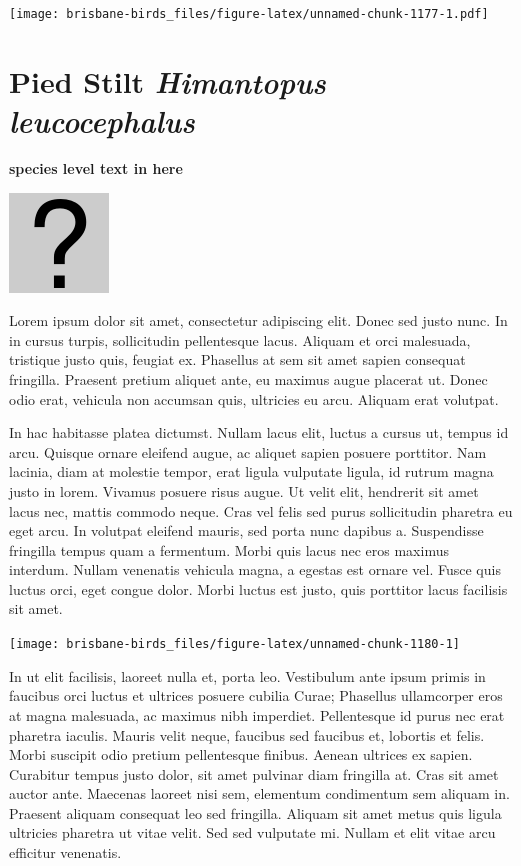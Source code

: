 \documentclass[]{book}
\let\origfigure\figure
\let\endorigfigure\endfigure
\renewenvironment{figure}[1][2] {
  \expandafter\origfigure\expandafter[H]
} {
  \endorigfigure
}
\begin{document}
\texttt{[image: brisbane-birds\_files/figure-latex/unnamed-chunk-1177-1.pdf]}

\section{\texorpdfstring{Pied Stilt \emph{Himantopus
leucocephalus}}{Pied Stilt Himantopus leucocephalus}}\label{pied-stilt-himantopus-leucocephalus}

\textbf{species level text in here}

\begin{figure}
\centering
\includegraphics{assets/missing.png}
\caption{No image for species}
\end{figure}

Lorem ipsum dolor sit amet, consectetur adipiscing elit. Donec sed justo
nunc. In in cursus turpis, sollicitudin pellentesque lacus. Aliquam et
orci malesuada, tristique justo quis, feugiat ex. Phasellus at sem sit
amet sapien consequat fringilla. Praesent pretium aliquet ante, eu
maximus augue placerat ut. Donec odio erat, vehicula non accumsan quis,
ultricies eu arcu. Aliquam erat volutpat.

In hac habitasse platea dictumst. Nullam lacus elit, luctus a cursus ut,
tempus id arcu. Quisque ornare eleifend augue, ac aliquet sapien posuere
porttitor. Nam lacinia, diam at molestie tempor, erat ligula vulputate
ligula, id rutrum magna justo in lorem. Vivamus posuere risus augue. Ut
velit elit, hendrerit sit amet lacus nec, mattis commodo neque. Cras vel
felis sed purus sollicitudin pharetra eu eget arcu. In volutpat eleifend
mauris, sed porta nunc dapibus a. Suspendisse fringilla tempus quam a
fermentum. Morbi quis lacus nec eros maximus interdum. Nullam venenatis
vehicula magna, a egestas est ornare vel. Fusce quis luctus orci, eget
congue dolor. Morbi luctus est justo, quis porttitor lacus facilisis sit
amet.

\begin{figure}
\texttt{[image: brisbane-birds\_files/figure-latex/unnamed-chunk-1180-1]} \caption{insert figure caption}\label{fig:unnamed-chunk-1180}
\end{figure}

In ut elit facilisis, laoreet nulla et, porta leo. Vestibulum ante ipsum
primis in faucibus orci luctus et ultrices posuere cubilia Curae;
Phasellus ullamcorper eros at magna malesuada, ac maximus nibh
imperdiet. Pellentesque id purus nec erat pharetra iaculis. Mauris velit
neque, faucibus sed faucibus et, lobortis et felis. Morbi suscipit odio
pretium pellentesque finibus. Aenean ultrices ex sapien. Curabitur
tempus justo dolor, sit amet pulvinar diam fringilla at. Cras sit amet
auctor ante. Maecenas laoreet nisi sem, elementum condimentum sem
aliquam in. Praesent aliquam consequat leo sed fringilla. Aliquam sit
amet metus quis ligula ultricies pharetra ut vitae velit. Sed sed
vulputate mi. Nullam et elit vitae arcu efficitur venenatis.
\end{document}
